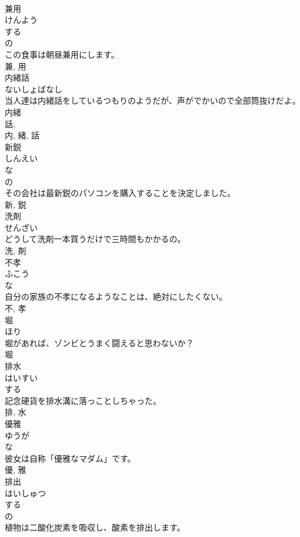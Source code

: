 \documentclass[8pt]{extreport}
\begin{document}
\begin{CJK}{UTF8}{min}
\\	兼用	
\\	けんよう	
\\	する 
\\	の 
\\	この食事は朝昼兼用にします。	
\\	兼, 用	
\\	内緒話	
\\	ないしょばなし	
\\	当人達は内緒話をしているつもりのようだが、声がでかいので全部筒抜けだよ。	
\\	内緒 
\\	話, 
\\	内, 緒, 話	
\\	新鋭	
\\	しんえい	
\\	な 
\\	の 
\\	その会社は最新鋭のパソコンを購入することを決定しました。	
\\	新, 鋭	
\\	洗剤	
\\	せんざい	
\\	どうして洗剤一本買うだけで三時間もかかるの。	
\\	洗, 剤	
\\	不孝	
\\	ふこう	
\\	な 
\\	自分の家族の不孝になるようなことは、絶対にしたくない。	
\\	不, 孝	
\\	堀	
\\	ほり	
\\	堀があれば、ゾンビとうまく闘えると思わないか？	
\\	堀	
\\	排水	
\\	はいすい	
\\	する 
\\	記念硬貨を排水溝に落っことしちゃった。	
\\	排, 水	
\\	優雅	
\\	ゆうが	
\\	な 
\\	彼女は自称「優雅なマダム」です。	
\\	優, 雅	
\\	排出	
\\	はいしゅつ	
\\	する 
\\	の 
\\	植物は二酸化炭素を吸収し、酸素を排出します。	

\end{CJK}
\end{document}
